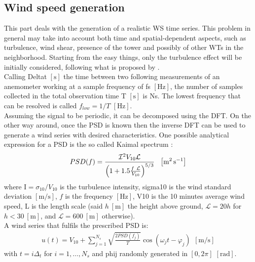 \subsection{Wind speed generation}
This part deals with the generation of a realistic \acrshort{WS} time series. This problem in general may take into account both time and spatial-dependent aspects, such as turbulence, wind shear, presence of the tower and possibly of other WTs in the neighborhood. Starting from the easy things, only the turbulence effect will be initially considered, following what is proposed by \cite{Aerodynamics_of_wind_turbines}. \\
Calling \acrshort{Deltat} $\left[\si{\second}\right]$ the time between two following measurements of an anemometer working at a sample frequency of \acrshort{fs} $\left[\si{\hertz}\right]$, the number of samples collected in the total observation time \acrshort{T} $\left[\si{\second}\right]$ is \acrshort{Ns}. The lowest frequency that can be resolved is called $f_{low}=1/T$ $\left[\si{\hertz}\right]$. \\
Assuming the signal to be periodic, it can be decomposed using the \acrfull{DFT}. On the other way around, once the \acrfull{PSD} is known then the inverse \acrshort{DFT} can be used to generate a wind series with desired characteristics. One possible analytical expression for a \acrshort{PSD} is the so called Kaimal spectrum \cite{Aerodynamics_of_wind_turbines}:
\begin{equation}
    PSD(f) = \frac{\mathcal{I} ^2V_{10}\mathcal{L} }{\left(1+1.5\frac{f \ \mathcal{L} }{V_{10}}\right)^{5/3}} \ \ \mesunt{\square \meter \per \second}
    \label{eq:PSD}
\end{equation}
where \acrshort{I}$=\sigma_{10}/V_{10}$ is the turbulence intensity, \acrshort{sigma10} is the wind standard deviation $\left[\si{\meter\per\second}\right]$, $f$ is the frequency $\left[\si{\hertz}\right]$, \acrshort{V10} is the 10 minutes average wind speed, \acrshort{L} is the length scale (said $h \ \left[\si{\meter}\right]$ the height above ground, $\mathcal{L}=20h$ for $h<30 \ \left[\si{\meter}\right]$, and  $\mathcal{L}=600 \ \left[\si{\meter}\right]$ otherwise).\\
A wind series that fulfils the prescribed \acrshort{PSD} is:
\begin{gather}
    u(t) = V_{10}+\sum_{j=1}^{N_s}\sqrt{\frac{2PSD(f_j)}{T}}\cos{(\omega_jt-\varphi_j)} \ \ \left[\si{\meter \per \second}\right]
    \label{eq:wind_series}
\end{gather}
with $t = i\Delta_t$ for $i=1,\dots,N_s$ and \acrshort{phij} randomly generated in $ \left[0, 2\pi\right]$ $\left[\si{\radian}\right]$. \\
